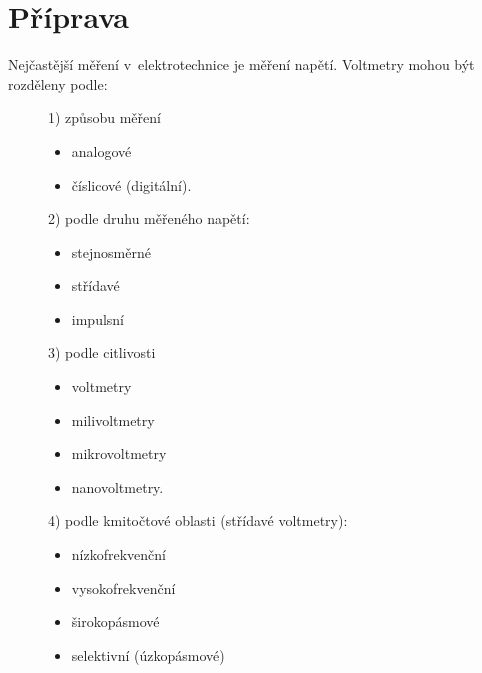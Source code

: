 \documentclass{article}
\begin{document}
\section*{Příprava}
Nejčastější měření v~elektrotechnice je měření napětí.
Voltmetry mohou být rozděleny podle:

\begin{figure}[H]
    \scriptsize
    {
        \begin{minipage}[t]{0.24\textwidth}
            1) způsobu měření
            \begin{itemize}
                \item analogové
                \item číslicové (digitální).
            \end{itemize}
        \end{minipage}
        \hfill
        \begin{minipage}[t]{0.24\textwidth}
            2) podle druhu měřeného napětí:
            \begin{itemize}
                \item stejnosměrné
                \item střídavé
                \item impulsní
            \end{itemize}
        \end{minipage}
        \hfill
        \begin{minipage}[t]{0.24\textwidth}
            3) podle citlivosti
            \begin{itemize}
                \item voltmetry
                \item milivoltmetry
                \item mikrovoltmetry
                \item nanovoltmetry.
            \end{itemize}
        \end{minipage}
        \hfill
        \begin{minipage}[t]{0.24\textwidth}
            4) podle kmitočtové oblasti (střídavé voltmetry):
            \begin{itemize}
                \item nízkofrekvenční
                \item vysokofrekvenční
                \item širokopásmové
                \item selektivní (úzkopásmové)
            \end{itemize}
        \end{minipage}
    }
\end{figure}
\end{document}
